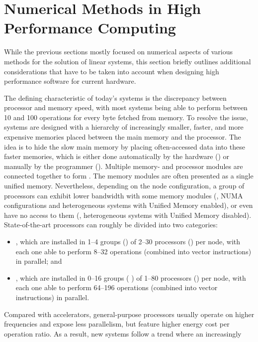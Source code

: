 \section{Numerical Methods in High Performance Computing}

While the previous sections mostly focused on numerical aspects of various
methods for the solution of linear systems, this section briefly outlines
additional considerations that have to be taken into account when designing high
performance software for current hardware.

The defining characteristic of today's systems is the discrepancy between
processor and memory speed, with most systems being able to perform between 10
and 100 operations for every byte fetched from memory. To resolve the issue,
systems are designed with a hierarchy of increasingly smaller, faster, and more
expensive memories placed between the main memory and the processor. The idea is
to hide the slow main memory by placing often-accessed data into these faster
memories, which is either done automatically by the hardware () or
manually by the programmer (). Multiple memory- and
processor modules are connected together to form . The memory
modules are often presented as a single unified memory. Nevertheless, depending
on the node configuration, a group of processors can exhibit lower
bandwidth with some memory modules (\eg, NUMA configurations and
heterogeneous systems with Unified Memory enabled), or even have no access
to them (\eg, heterogeneous systems with Unified Memory disabled).
State-of-the-art processors can roughly be divided into two categories:
\begin{itemize}
\item {}, which are installed in 1--4 groups
(\ie {}) of 2--30 processors (\ie {}) per node, with
each one able to perform 8--32 operations (combined into vector instructions) in
parallel; and
\item {}, which are installed in 0--16 groups (\eg
{}) of 1--80 processors (\eg {})
per node, with each one able to perform 64--196 operations (combined into vector
instructions) in parallel.
\end{itemize}
Compared with accelerators, general-purpose processors usually operate on higher
frequencies and expose less parallelism, but feature higher energy cost per
operation ratio. As a result, new systems follow a trend where an increasingly
